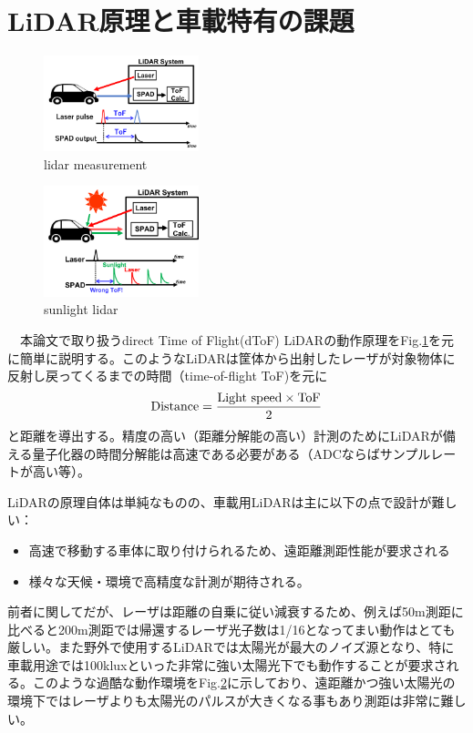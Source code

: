 \documentclass[twocolumn, 11pt, a4j]{article}
\begin{document}
\section{LiDAR原理と車載特有の課題}
\begin{figure}[!t]
\centering
 \includegraphics[width=0.4\textwidth]{figs/lidar.png}
  \caption{lidar measurement}
\label{lidar}
\end{figure}

\begin{figure}[!t]
\centering
 \includegraphics[width=0.4\textwidth]{figs/sunlight.png}
  \caption{sunlight lidar}
\label{sunlight}
\end{figure}

　本論文で取り扱うdirect Time of Flight(dToF) LiDARの動作原理をFig.\ref{lidar}を元に簡単に説明する。このようなLiDARは筐体から出射したレーザが対象物体に反射し戻ってくるまでの時間（time-of-flight ToF)を元に
\begin{eqnarray}
    \centering
    \textrm{Distance} = \frac{\textrm{Light speed} \times \textrm{ToF}}{2}
    \label{dist}
\end{eqnarray}
と距離を導出する。精度の高い（距離分解能の高い）計測のためにLiDARが備える量子化器の時間分解能は高速である必要がある（ADCならばサンプルレートが高い等）。

LiDARの原理自体は単純なものの、車載用LiDARは主に以下の点で設計が難しい：
\begin{itemize}
\item 高速で移動する車体に取り付けられるため、遠距離測距性能が要求される
\item 様々な天候・環境で高精度な計測が期待される。
\end{itemize}
前者に関してだが、レーザは距離の自乗に従い減衰するため、例えば50m測距に比べると200m測距では帰還するレーザ光子数は1/16となってまい動作はとても厳しい。また野外で使用するLiDARでは太陽光が最大のノイズ源となり、特に車載用途では100kluxといった非常に強い太陽光下でも動作することが要求される。このような過酷な動作環境をFig.\ref{sunlight}に示しており、遠距離かつ強い太陽光の環境下ではレーザよりも太陽光のパルスが大きくなる事もあり測距は非常に難しい。
\end{document}
